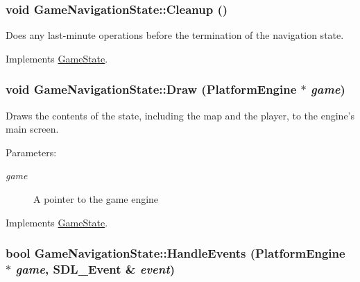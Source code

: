\hypertarget{class_game_navigation_state_f93a7dbb7eac4b14a6d59cbca32b9abd}{
\subsubsection[{Cleanup}]{\setlength{\rightskip}{0pt plus 5cm}void GameNavigationState::Cleanup ()}}
\label{de/d2a/class_game_navigation_state_f93a7dbb7eac4b14a6d59cbca32b9abd}


Does any last-minute operations before the termination of the navigation state. 

Implements \hyperlink{class_game_state_041e7a5430d71da84745af11abdacd93}{GameState}.\hypertarget{class_game_navigation_state_a37dce070a906454c512192c067fda09}{
\subsubsection[{Draw}]{\setlength{\rightskip}{0pt plus 5cm}void GameNavigationState::Draw ({\bf PlatformEngine} $\ast$ {\em game})}}
\label{de/d2a/class_game_navigation_state_a37dce070a906454c512192c067fda09}


Draws the contents of the state, including the map and the player, to the engine's main screen.

\begin{Desc}
\item[Parameters:]
\begin{description}
\item[{\em game}]A pointer to the game engine \end{description}
\end{Desc}


Implements \hyperlink{class_game_state_7333dda0f49b3fa1c01cd3295f853024}{GameState}.\hypertarget{class_game_navigation_state_6e7c13d35a33478673c62ae55394cfdc}{
\subsubsection[{HandleEvents}]{\setlength{\rightskip}{0pt plus 5cm}bool GameNavigationState::HandleEvents ({\bf PlatformEngine} $\ast$ {\em game}, \/  SDL\_\-Event \& {\em event})}}
\label{de/d2a/class_game_navigation_state_6e7c13d35a33478673c62ae55394cfdc}


